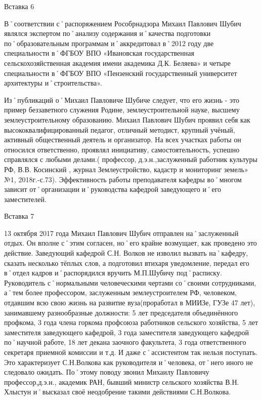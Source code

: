 Вставка 6

В˚соответствии с˚распоряжением Рособрнадзора Михаил Павлович Шубич являлся экспертом по˚анализу содержания и˚качества подготовки по˚образовательным программам и˚аккредитовал в˚2012 году две специальности в˚ФГБОУ ВПО «Ивановская государственная сельскохозяйственная академия имени академика Д.К. Беляева» и четыре специальности в˚ФГБОУ ВПО «Пензенский государственный университет архитектуры и˚строительства». 

Из˚публикаций о˚Михаил Павловиче Шубиче следует, что его жизнь - это пример беззаветного служения Родине, землеустроительной науке, высшему землеустроительному образованию.
Михаил Павлович Шубич проявил себя как высококвалифицированный педагог, отличный методист, крупный учёный, активный общественный деятель и организатор. На всех участках работы он относился ответственно, проявлял инициативу, самостоятельность, успешно справлялся с любыми делами.( профессор, д.э.н.,заслуженный работник культуры РФ, В.В. Косинский , журнал Землеустройство, кадастр и мониторинг земель» №1, 2018г.-с.73).
Эффективность работы преподавателя кафедры во˚многом зависит от˚организации и˚руководства кафедрой заведующего и˚его заместителей.

Вставка 7

13 октября 2017 года Михаил Павлович Шубич отправлен на˚заслуженный отдых. Он вполне с˚этим согласен, но˚его крайне возмущает, как проведено это действие. Заведующий кафедрой С.Н. Волков не изволил вызвать на˚кафедру, сказать несколько тёплых слов, а подготовил втихаря уведомление, передал его в˚отдел кадров и˚распорядился вручить М.П.Шубичу под˚расписку. Руководитель с˚нормальными человеческими чертами со˚своими сотрудниками, а˚тем более профессором, заслуженным землеустроителем РФ, человеком, отдавшим всю свою жизнь на развитие вуза(проработал в МИИЗе, ГУЗе 47 лет), занимавшему разнообразные должности: 5 лет председателя объединённого профкома, 3 года члена горкома профсоюза работников сельского хозяйства, 5 лет заместителя заведующего кафедрой, 3 года заместителя заведующего кафедрой по˚научной работе, 18 лет декана заочного факультета, 3 года ответственного секретаря приемной комиссии и т.д. И даже с˚ассистентом так нельзя поступать. Это характеризует С.Н.Волкова как руководителя и˚человека, от˚него иного не следовало ожидать. По˚этому поводу звонил Михаилу Павловичу профессор,д.э.н., академик РАН, бывший министр сельского хозяйства В.Н. Хлыстун и˚высказал своё неодобрение такими действиями С.Н.Волкова.